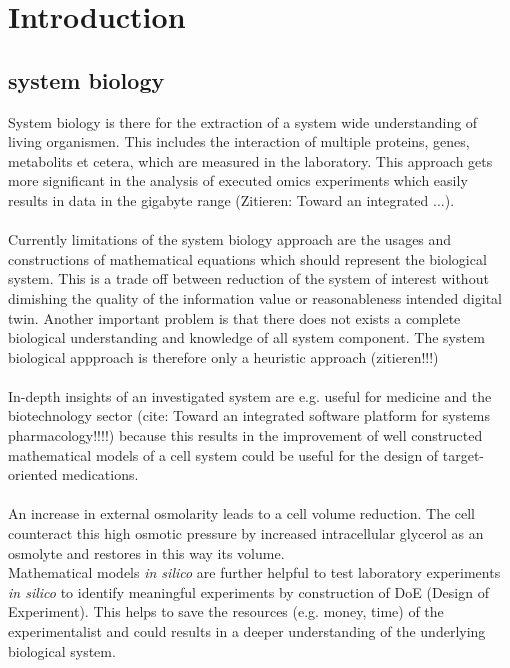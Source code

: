 \section{Introduction}
\pagestyle{headings}


\subsection{system biology}
System biology is there for the extraction of a system wide understanding of living organismen. This includes the interaction of multiple proteins, genes, metabolits et cetera, which are measured in the laboratory. This approach gets more significant in the analysis of executed omics experiments which easily results in data in the gigabyte range (Zitieren: Toward an integrated ...). \\\\
Currently limitations of the system biology approach are the usages and constructions of mathematical equations which should represent the biological system. This is a trade off between reduction of the system of interest without dimishing the quality of the information value or reasonableness intended digital twin. Another important problem is that there does not exists a complete biological understanding and knowledge of all system component. The system biological appproach is therefore only a heuristic approach (zitieren!!!) \\\\
In-depth insights of an investigated system are e.g. useful for medicine and the biotechnology sector (cite: Toward an integrated software platform for systems pharmacology!!!!) because this results in the improvement of  
well constructed mathematical models of a cell system could be useful for the design of target-oriented medications. \\\\
An increase in external osmolarity leads to a cell volume reduction. The cell counteract this high osmotic pressure by increased intracellular glycerol as an osmolyte and restores in this way its volume. \\


Mathematical models \textit{in silico} are further helpful to test laboratory experiments \textit{in silico} to identify meaningful experiments by construction of DoE (Design of Experiment). This helps to save the resources (e.g. money, time) of the experimentalist and could results in a deeper understanding of the underlying biological system.\\\\

